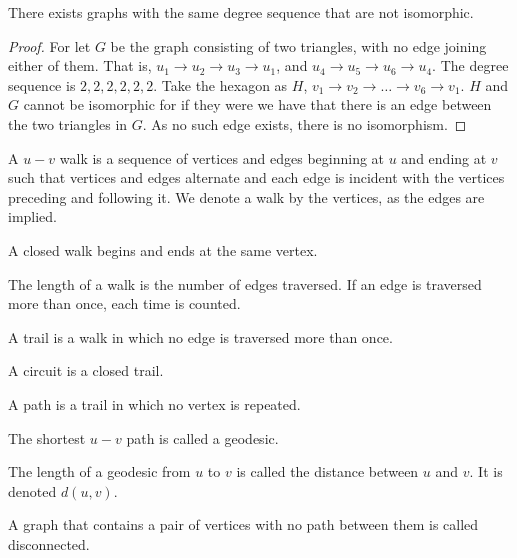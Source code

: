 \documentclass[crop=false,class=book,oneside]{standalone}
\begin{document}
\begin{theorem}
There exists graphs with the same degree sequence that are not
isomorphic.
\end{theorem}
\begin{proof}
For let $G$ be the graph consisting of two triangles, with no edge joining either of them. That is, $u_1\rightarrow u_2 \rightarrow u_3\rightarrow u_1$, and $u_4\rightarrow u_5 \rightarrow u_6 \rightarrow u_4$. The degree sequence is $2,2,2,2,2,2$. Take the hexagon as $H$, $v_1\rightarrow v_2 \rightarrow \hdots \rightarrow v_6 \rightarrow v_1$. $H$ and $G$ cannot be isomorphic for if they were we have that there is an edge between the two triangles in $G$. As no such edge exists, there is no isomorphism.
\end{proof}
\begin{definition}
A $u-v$ walk is a sequence of vertices and edges beginning at $u$ and ending at $v$ such that vertices and edges alternate and each edge is incident with the vertices preceding and following it. We denote a walk by the vertices, as the edges are implied.
\end{definition}
\begin{definition}
A closed walk begins and ends at the same vertex.
\end{definition}
\begin{definition}
The length of a walk is the number of edges traversed. If an edge is traversed more than once, each time is counted.
\end{definition}
\begin{definition}
A trail is a walk in which no edge is traversed more than once.
\end{definition}
\begin{definition} A circuit is a closed trail.
\end{definition}
\begin{definition}
A path is a trail in which no vertex is repeated.
\end{definition}
\begin{definition}
The shortest $u-v$ path is called a geodesic.
\end{definition}
\begin{definition}
The length of a geodesic from $u$ to $v$ is called the distance between $u$ and $v$. It is denoted $d(u,v)$.
\end{definition}
\begin{definition}
A graph that contains a pair of vertices with no path between them is called disconnected.
\end{definition}
\end{document}
